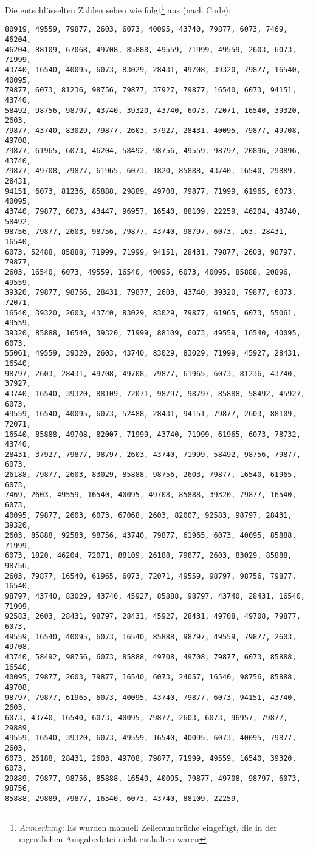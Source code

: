 \documentclass{article}
\begin{document}
Die entschlüsselten Zahlen sehen wie folgt\footnote{\textit{Anmerkung:} Es wurden manuell Zeilenumbrüche eingefügt, die in der eigentlichen Ausgabedatei nicht enthalten waren} aus (nach Code):
\begin{lstlisting}[caption=(msg.txt)-dec.txt]
80919, 49559, 79877, 2603, 6073, 40095, 43740, 79877, 6073, 7469, 46204,
46204, 88109, 67068, 49708, 85888, 49559, 71999, 49559, 2603, 6073, 71999,
43740, 16540, 40095, 6073, 83029, 28431, 49708, 39320, 79877, 16540, 40095,
79877, 6073, 81236, 98756, 79877, 37927, 79877, 16540, 6073, 94151, 43740,
58492, 98756, 98797, 43740, 39320, 43740, 6073, 72071, 16540, 39320, 2603,
79877, 43740, 83029, 79877, 2603, 37927, 28431, 40095, 79877, 49708, 49708,
79877, 61965, 6073, 46204, 58492, 98756, 49559, 98797, 20896, 20896, 43740,
79877, 49708, 79877, 61965, 6073, 1820, 85888, 43740, 16540, 29889, 28431,
94151, 6073, 81236, 85888, 29889, 49708, 79877, 71999, 61965, 6073, 40095,
43740, 79877, 6073, 43447, 96957, 16540, 88109, 22259, 46204, 43740, 58492,
98756, 79877, 2603, 98756, 79877, 43740, 98797, 6073, 163, 28431, 16540,
6073, 52488, 85888, 71999, 71999, 94151, 28431, 79877, 2603, 98797, 79877,
2603, 16540, 6073, 49559, 16540, 40095, 6073, 40095, 85888, 20896, 49559,
39320, 79877, 98756, 28431, 79877, 2603, 43740, 39320, 79877, 6073, 72071,
16540, 39320, 2603, 43740, 83029, 83029, 79877, 61965, 6073, 55061, 49559,
39320, 85888, 16540, 39320, 71999, 88109, 6073, 49559, 16540, 40095, 6073,
55061, 49559, 39320, 2603, 43740, 83029, 83029, 71999, 45927, 28431, 16540,
98797, 2603, 28431, 49708, 49708, 79877, 61965, 6073, 81236, 43740, 37927,
43740, 16540, 39320, 88109, 72071, 98797, 98797, 85888, 58492, 45927, 6073,
49559, 16540, 40095, 6073, 52488, 28431, 94151, 79877, 2603, 88109, 72071,
16540, 85888, 49708, 82007, 71999, 43740, 71999, 61965, 6073, 78732, 43740,
28431, 37927, 79877, 98797, 2603, 43740, 71999, 58492, 98756, 79877, 6073,
26188, 79877, 2603, 83029, 85888, 98756, 2603, 79877, 16540, 61965, 6073,
7469, 2603, 49559, 16540, 40095, 49708, 85888, 39320, 79877, 16540, 6073,
40095, 79877, 2603, 6073, 67068, 2603, 82007, 92583, 98797, 28431, 39320,
2603, 85888, 92583, 98756, 43740, 79877, 61965, 6073, 40095, 85888, 71999,
6073, 1820, 46204, 72071, 88109, 26188, 79877, 2603, 83029, 85888, 98756,
2603, 79877, 16540, 61965, 6073, 72071, 49559, 98797, 98756, 79877, 16540,
98797, 43740, 83029, 43740, 45927, 85888, 98797, 43740, 28431, 16540, 71999,
92583, 2603, 28431, 98797, 28431, 45927, 28431, 49708, 49708, 79877, 6073,
49559, 16540, 40095, 6073, 16540, 85888, 98797, 49559, 79877, 2603, 49708,
43740, 58492, 98756, 6073, 85888, 49708, 49708, 79877, 6073, 85888, 16540,
40095, 79877, 2603, 79877, 16540, 6073, 24057, 16540, 98756, 85888, 49708,
98797, 79877, 61965, 6073, 40095, 43740, 79877, 6073, 94151, 43740, 2603,
6073, 43740, 16540, 6073, 40095, 79877, 2603, 6073, 96957, 79877, 29889,
49559, 16540, 39320, 6073, 49559, 16540, 40095, 6073, 40095, 79877, 2603,
6073, 26188, 28431, 2603, 49708, 79877, 71999, 49559, 16540, 39320, 6073,
29889, 79877, 98756, 85888, 16540, 40095, 79877, 49708, 98797, 6073, 98756,
85888, 29889, 79877, 16540, 6073, 43740, 88109, 22259, 
\end{lstlisting}
\end{document}
